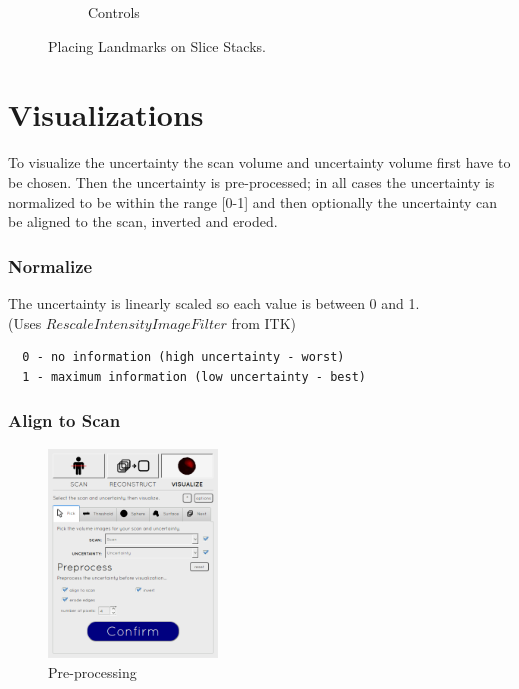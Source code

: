 \begin{figure}[H]
\begin{subfigure}[b]{0.441\textwidth}
    \caption*{Controls}
    \label{fig:reconstructioncontrols}
  \end{subfigure}
  \caption{Placing Landmarks on Slice Stacks.}\label{fig:reconstructionlandmarks}
\end{figure}

\clearpage
\section{Visualizations}\label{implementation:visualizations}
To visualize the uncertainty the scan volume and uncertainty volume first have to be chosen. Then the uncertainty is pre-processed; in all cases the uncertainty is normalized to be within the range [0-1] and then optionally the uncertainty can be aligned to the scan, inverted and eroded.

\subsubsection*{Normalize}
The uncertainty is linearly scaled so each value is between 0 and 1.\\(Uses $RescaleIntensityImageFilter$ from ITK)

\begin{verbatim}
  0 - no information (high uncertainty - worst)
  1 - maximum information (low uncertainty - best)
\end{verbatim}

\subsubsection*{Align to Scan}
\begin{figure}
  \vspace{-20pt}
  \includegraphics[width=0.4\textwidth]{images/pre-processing.png}
  \caption{Pre-processing}\label{fig:pre-processing_settings}
\end{figure}

